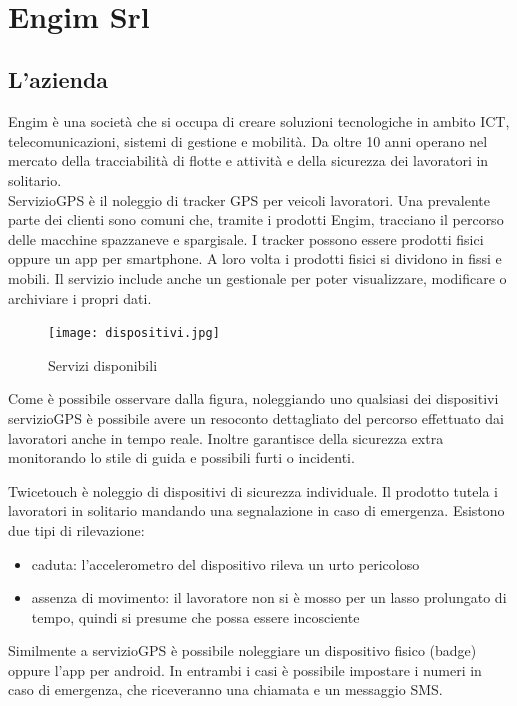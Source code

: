 \documentclass[12pt]{article}
\begin{document}
\thispagestyle{empty}
\newpage 
\thispagestyle{empty}
\
\newpage

\section{Engim Srl}
\subsection{L'azienda}
Engim è una società che si occupa di creare soluzioni tecnologiche in ambito 
ICT, telecomunicazioni, sistemi di gestione e mobilità. Da oltre 10 anni operano 
nel mercato della tracciabilità di flotte e attività e della 
sicurezza dei lavoratori in solitario.
\\ ServizioGPS è il noleggio di tracker GPS per veicoli lavoratori. 
Una prevalente parte dei clienti sono comuni che, tramite i prodotti Engim, 
tracciano il percorso delle macchine spazzaneve e spargisale.
I tracker possono essere prodotti fisici oppure un app per smartphone. A loro 
volta i prodotti fisici si dividono in fissi e mobili. Il servizio include
anche un gestionale per poter visualizzare, modificare o archiviare i propri dati.

\begin{figure}[H]
\texttt{[image: dispositivi.jpg]}
\centering
\caption{Servizi disponibili}
\end{figure}
Come è possibile osservare dalla figura, noleggiando uno qualsiasi dei dispositivi 
servizioGPS è possibile avere un resoconto dettagliato del percorso effettuato 
dai lavoratori anche in tempo reale. 
Inoltre garantisce della sicurezza extra monitorando lo stile di guida e 
possibili furti o incidenti. 

Twicetouch è noleggio di dispositivi di sicurezza individuale.
Il prodotto tutela i lavoratori in solitario mandando una segnalazione in caso di
emergenza. Esistono due tipi di rilevazione: 
\begin{itemize}
  \item caduta: l'accelerometro del dispositivo rileva un urto pericoloso
  \item assenza di movimento: il lavoratore non si è mosso per un lasso prolungato di tempo, 
  quindi si presume che possa essere incosciente
\end{itemize}
Similmente a servizioGPS è possibile noleggiare un dispositivo fisico (badge) oppure
l'app per android. In entrambi i casi è possibile impostare i numeri in caso di 
emergenza, che riceveranno una chiamata e un messaggio SMS.
\end{document}
